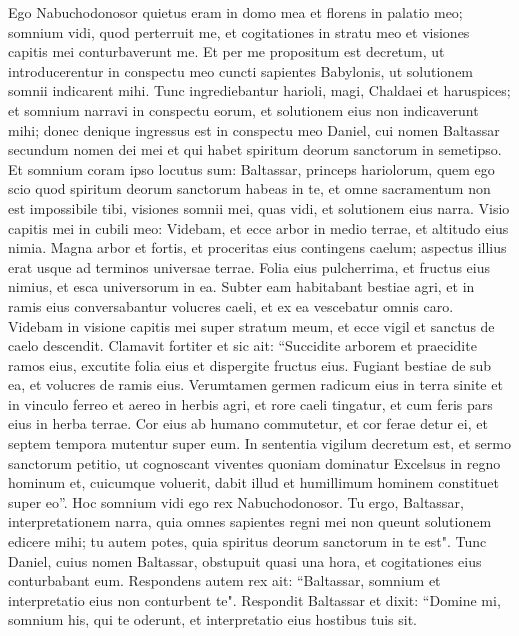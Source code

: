 \begin{biblechapter}  
\verse Ego Nabuchodonosor quietus eram in domo mea et florens in palatio meo;  
\verse somnium vidi, quod perterruit me, et cogitationes in stratu meo et visiones capitis mei conturbaverunt me. 
\verse Et per me propositum est decretum, ut introducerentur in conspectu meo cuncti sapientes Babylonis, ut solutionem somnii indicarent mihi. 
\verse Tunc ingrediebantur harioli, magi, Chaldaei et haruspices; et somnium narravi in conspectu eorum, et solutionem eius non indicaverunt mihi; 
\verse donec denique ingressus est in conspectu meo Daniel, cui nomen Baltassar secundum nomen dei mei et qui habet spiritum deorum sanctorum in semetipso. Et somnium coram ipso locutus sum: 
\verse Baltassar, princeps hariolorum, quem ego scio quod spiritum deorum sanctorum habeas in te, et omne sacramentum non est impossibile tibi, visiones somnii mei, quas vidi, et solutionem eius narra. 
\verse Visio capitis mei in cubili meo: Videbam, et ecce arbor in medio terrae, et altitudo eius nimia. 
\verse Magna arbor et fortis, et proceritas eius contingens caelum; aspectus illius erat usque ad terminos universae terrae. 
\verse Folia eius pulcherrima, et fructus eius nimius, et esca universorum in ea. Subter eam habitabant bestiae agri, et in ramis eius conversabantur volucres caeli, et ex ea vescebatur omnis caro. 
\verse Videbam in visione capitis mei super stratum meum, et ecce vigil et sanctus de caelo descendit. 
\verse Clamavit fortiter et sic ait: “Succidite arborem et praecidite ramos eius, excutite folia eius et dispergite fructus eius. Fugiant bestiae de sub ea, et volucres de ramis eius. 
\verse Verumtamen germen radicum eius in terra sinite et in vinculo ferreo et aereo in herbis agri, et rore caeli tingatur, et cum feris pars eius in herba terrae. 
\verse Cor eius ab humano commutetur, et cor ferae detur ei, et septem tempora mutentur super eum. 
\verse In sententia vigilum decretum est, et sermo sanctorum petitio, ut cognoscant viventes quoniam dominatur Excelsus in regno hominum et, cuicumque voluerit, dabit illud et humillimum hominem constituet super eo”. 
\verse Hoc somnium vidi ego rex Nabuchodonosor. Tu ergo, Baltassar, interpretationem narra, quia omnes sapientes regni mei non queunt solutionem edicere mihi; tu autem potes, quia spiritus deorum sanctorum in te est". 
\verse Tunc Daniel, cuius nomen Baltassar, obstupuit quasi una hora, et cogitationes eius conturbabant eum. Respondens autem rex ait: “Baltassar, somnium et interpretatio eius non conturbent te". Respondit Baltassar et dixit: “Domine mi, somnium his, qui te oderunt, et interpretatio eius hostibus tuis sit. 

\end{biblechapter}
